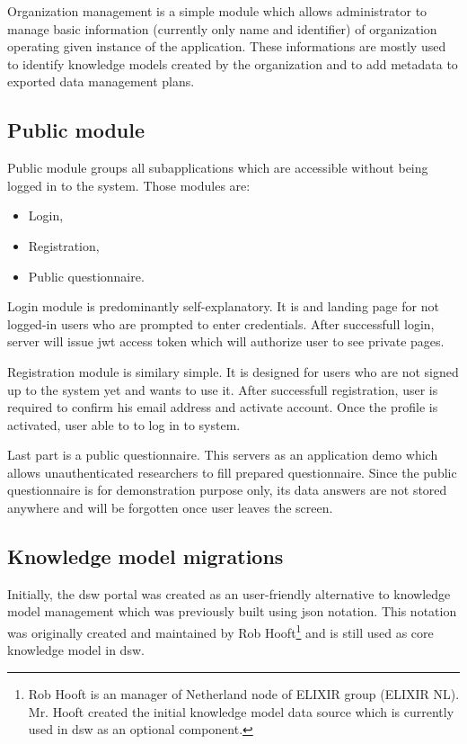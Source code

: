Organization management is a simple module which allows administrator to manage basic information (currently only name and identifier) of organization operating given instance of the application.
These informations are mostly used to identify knowledge models created by the organization and to add metadata to exported data management plans.

\subsection{Public module}

Public module groups all subapplications which are accessible without being logged in to the system.
Those modules are:

\begin{itemize}
    \item Login,
    \item Registration,
    \item Public questionnaire.
\end{itemize}

Login module is predominantly self-explanatory.
It is and landing page for not logged-in users who are prompted to enter credentials.
After successfull login, server will issue \gls{jwt} access token which will authorize user to see private pages.

Registration module is similary simple.
It is designed for users who are not signed up to the system yet and wants to use it.
After successfull registration, user is required to confirm his email address and activate account.
Once the profile is activated, user able to to log in to system.

Last part is a public questionnaire.
This servers as an application demo which allows unauthenticated researchers to fill prepared questionnaire.
Since the public questionnaire is for demonstration purpose only, its data answers are not stored anywhere and will be forgotten once user leaves the screen.


\subsection{Knowledge model migrations}\label{sec:km-migrations}

Initially, the \gls{dsw} portal was created as an user-friendly alternative to knowledge model management which was previously built using \gls{json} notation.
This notation was originally created and maintained by Rob Hooft\footnote{Rob Hooft is an manager of Netherland node of ELIXIR group (ELIXIR NL). Mr. Hooft created the initial knowledge model data source which is currently used in \gls{dsw} as an optional component.} and is still used as core knowledge model in \gls{dsw}.

